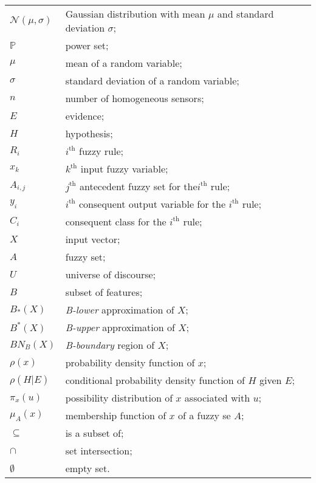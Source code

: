 \begin{longtable}{ll}
	$\mathcal{N}(\mu,\sigma)$	& Gaussian distribution with mean $\mu$ and standard deviation $\sigma$; \\
	$\mathbb{P}$			& power set; \\
	
	$\mu$ 					& mean of a random variable; \\
	$\sigma$ 				& standard deviation of a random variable;\\
	
	$n$						& number of homogeneous sensors; \\
	$E$						& evidence; \\ 
	$H$						& hypothesis; \\
	$R_i$					& $i^{\textrm{th}}$ fuzzy rule; \\
	$x_k$					& $k^{\textrm{th}}$ input fuzzy variable; \\
	$A_{i,j}$				& $j^{\textrm{th}}$ antecedent fuzzy set for the$i^{\textrm{th}}$ rule; \\
	$y_i$					& $i^{\textrm{th}}$ consequent output variable for the $i^{\textrm{th}}$ rule; \\
	$C_i$					& consequent class for the $i^{\textrm{th}}$ rule; \\
	$X$						& input vector; \\
	$A$						& fuzzy set; \\
	$U$						& universe of discourse; \\
	$B$						& subset of features; \\
	$B_*(X)$				& \textit{B-lower} approximation of $X$; \\
	$B^*(X)$				& \textit{B-upper} approximation of $X$; \\
	$BN_B(X)$				& \textit{B-boundary} region of $X$; \\
	
	$\rho(x)$				& probability density function of $x$; \\
	$\rho(H|E)$				& conditional probability density function of $H$ given $E$; \\
	$\pi_x(u)$				& possibility distribution of $x$ associated with $u$; \\
	$\mu_A(x)$				& membership function of $x$ of a fuzzy se $A$; \\
	
	
	$\subseteq$				& is a subset of; \\
	$\cap$					& set intersection; \\
	$\emptyset$				& empty set. \\
	
\end{longtable}


